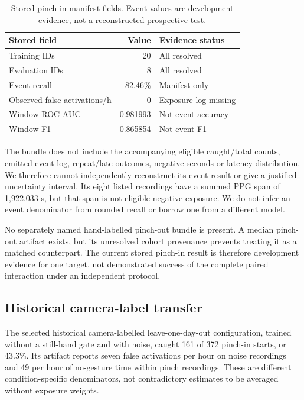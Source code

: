 \begin{table}[t]
\centering\small
\caption{Stored pinch-in manifest fields. Event values are development evidence, not a reconstructed prospective test.}
\begin{tabularx}{\linewidth}{@{}>{\raggedright\arraybackslash}Xr>{\raggedright\arraybackslash}X@{}}
\toprule
\textbf{Stored field} & \textbf{Value} & \textbf{Evidence status} \\
\midrule
Training IDs & 20 & All resolved \\
Evaluation IDs & 8 & All resolved \\
Event recall & 82.46\% & Manifest only \\
Observed false activations/h & 0 & Exposure log missing \\
Window ROC AUC & 0.981993 & Not event accuracy \\
Window F1 & 0.865854 & Not event F1 \\
\bottomrule
\end{tabularx}
\end{table}

The bundle does not include the accompanying eligible caught/total counts, emitted event log, repeat/late outcomes, negative seconds or latency distribution. We therefore cannot independently reconstruct its event result or give a justified uncertainty interval. Its eight listed recordings have a summed PPG span of 1,922.033 s, but that span is not eligible negative exposure. We do not infer an event denominator from rounded recall or borrow one from a different model.

No separately named hand-labelled pinch-out bundle is present. A median pinch-out artifact exists, but its unresolved cohort provenance prevents treating it as a matched counterpart. The current stored pinch-in result is therefore development evidence for one target, not demonstrated success of the complete paired interaction under an independent protocol.

\subsection{Historical camera-label transfer}\label{historical-camera-label-transfer}

The selected historical camera-labelled leave-one-day-out configuration, trained without a still-hand gate and with noise, caught 161 of 372 pinch-in starts, or 43.3\%. Its artifact reports seven false activations per hour on noise recordings and 49 per hour of no-gesture time within pinch recordings. These are different condition-specific denominators, not contradictory estimates to be averaged without exposure weights.

